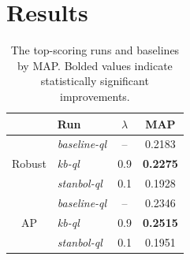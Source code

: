 \documentclass{sig-alternate}
\begin{document}
\section{Results}\label{section.results}

\begin{table}[htbp]
\centering
\begin{tabular}{|c|l|c|c|} \hline
& {\bf Run} & {\bf $\lambda$} & {\bf MAP} \\ \hline
\multirow{3}{*}{Robust} & {\it baseline-ql} & -- & 0.2183 \\ \cline{2-4}
& {\it kb-ql} & 0.9 & {\bf 0.2275} \\ \cline{2-4}
& {\it stanbol-ql} & 0.1 & 0.1928 \\ \hline \hline 
\multirow{3}{*}{AP} & {\it baseline-ql} & -- & 0.2346 \\ \cline{2-4}
& {\it kb-ql} & 0.9 & {\bf 0.2515} \\ \cline{2-4}
& {\it stanbol-ql} & 0.1 & 0.1951 \\ \hline
\end{tabular}
\caption{The top-scoring runs and baselines by MAP. Bolded values indicate statistically significant improvements.}
\label{table.performance}
\end{table}
\end{document}
